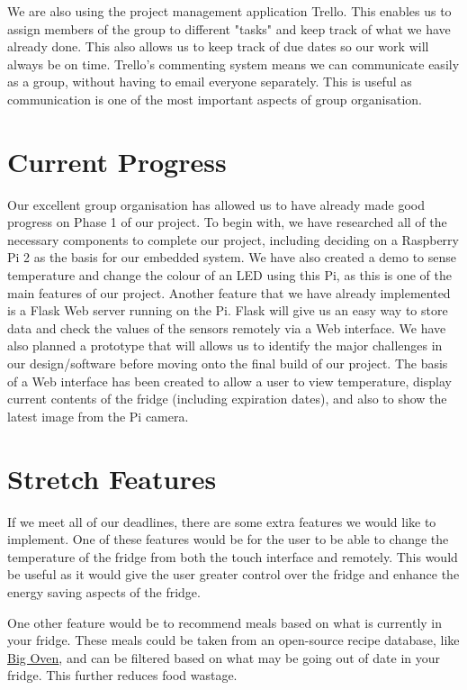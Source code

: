 \documentclass[10pt]{article}
\begin{document}
We are also using the project management application Trello. This enables us to assign members of the group to different "tasks" and keep track of what we have already done. This also allows us to keep track of due dates so our work will always be on time. Trello's commenting system means we can communicate easily as a group, without having to email everyone separately. This is useful as communication is one of the most important aspects of group organisation.

\section{Current Progress}

Our excellent group organisation has allowed us to have already made good progress on Phase 1 of our project. To begin with, we have researched all of the necessary components to complete our project, including deciding on a Raspberry Pi 2 as the basis for our embedded system. We have also created a demo to sense temperature and change the colour of an LED using this Pi, as this is one of the main features of our project. Another feature that we have already implemented is a Flask Web server running on the Pi. Flask will give us an easy way to store data and check the values of the sensors remotely via a Web interface. We have also planned a prototype that will allows us to identify the major challenges in our design/software before moving onto the final build of our project. The basis of a Web interface has been created to allow a user to view temperature, display current contents of the fridge (including expiration dates), and also to show the latest image from the Pi camera.

\section{Stretch Features}
If we meet all of our deadlines, there are some extra features we would like to implement. One of these features would be for the user to be able to change the temperature of the fridge from both the touch interface and remotely. This would be useful as it would give the user greater control over the fridge and enhance the energy saving aspects of the fridge.

One other feature would be to recommend meals based on what is currently in your fridge. These meals could be taken from an open-source recipe database, like \href{http://api.bigoven.com}{Big Oven}, and can be filtered based on what may be going out of date in your fridge. This further reduces food wastage.
\end{document}
